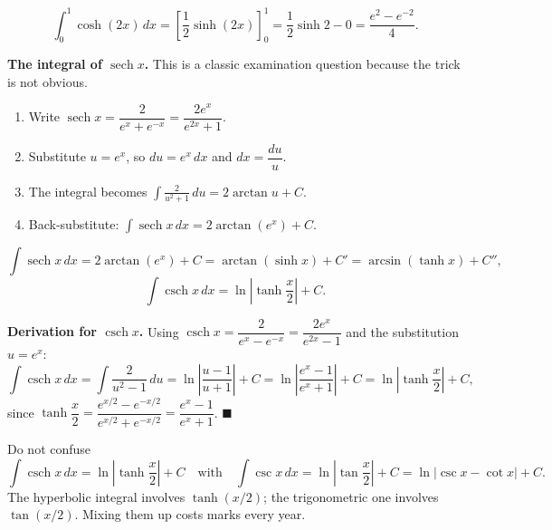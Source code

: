 \documentclass[11pt]{article}
\begin{document}
\begin{exemplebox}
\[
\int_0^1 \cosh(2x)\,dx = \left[\frac{1}{2}\sinh(2x)\right]_0^1 = \frac{1}{2}\sinh 2 - 0 = \frac{e^2 - e^{-2}}{4}.
\]
\end{exemplebox}

\textbf{The integral of $\operatorname{sech} x$.} This is a classic examination question because the trick is not obvious.

\begin{methode}[Integrating $\operatorname{sech} x$ (standard substitution $u = e^x$)]
\begin{enumerate}
\item Write $\operatorname{sech} x = \dfrac{2}{e^x + e^{-x}} = \dfrac{2e^x}{e^{2x}+1}$.
\item Substitute $u = e^x$, so $du = e^x\,dx$ and $dx = \dfrac{du}{u}$.
\item The integral becomes $\displaystyle\int \frac{2}{u^2+1}\,du = 2\arctan u + C$.
\item Back-substitute: $\displaystyle\int \operatorname{sech} x \, dx = 2\arctan(e^x) + C$.
\end{enumerate}
\end{methode}

\begin{propriete}
\[
\int \operatorname{sech} x \, dx = 2\arctan(e^x) + C = \arctan(\sinh x) + C' = \arcsin(\tanh x) + C'',
\]
\[
\int \operatorname{csch} x \, dx = \ln\left|\tanh\frac{x}{2}\right| + C.
\]
\end{propriete}

\textbf{Derivation for $\operatorname{csch} x$.} Using $\operatorname{csch} x = \dfrac{2}{e^x - e^{-x}} = \dfrac{2e^x}{e^{2x}-1}$ and the substitution $u = e^x$:
\[
\int \operatorname{csch} x \, dx = \int \frac{2}{u^2 - 1}\,du = \ln\left|\frac{u-1}{u+1}\right| + C = \ln\left|\frac{e^x - 1}{e^x + 1}\right| + C = \ln\left|\tanh\frac{x}{2}\right| + C,
\]
since $\tanh\dfrac{x}{2} = \dfrac{e^{x/2} - e^{-x/2}}{e^{x/2} + e^{-x/2}} = \dfrac{e^x - 1}{e^x + 1}$. $\blacksquare$

\begin{attention}
Do not confuse
\[
\int \operatorname{csch} x \, dx = \ln\left|\tanh\frac{x}{2}\right| + C
\quad\text{with}\quad
\int \csc x \, dx = \ln\left|\tan\frac{x}{2}\right| + C = \ln|\csc x - \cot x| + C.
\]
The hyperbolic integral involves $\tanh(x/2)$; the trigonometric one involves $\tan(x/2)$. Mixing them up costs marks every year.
\end{attention}
\end{document}

